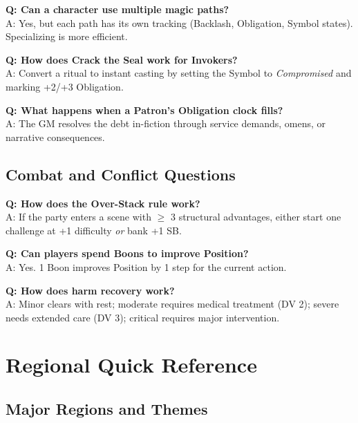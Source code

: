 \textbf{Q: Can a character use multiple magic paths?}\\
A: Yes, but each path has its own tracking (Backlash, Obligation, Symbol states). Specializing is more efficient.

\textbf{Q: How does Crack the Seal work for Invokers?}\\
A: Convert a ritual to instant casting by setting the Symbol to \emph{Compromised} and marking +2/+3 Obligation.

\textbf{Q: What happens when a Patron's Obligation clock fills?}\\
A: The GM resolves the debt in-fiction through service demands, omens, or narrative consequences.

\subsection{Combat and Conflict Questions}
\label{subsec:combat-questions}

\textbf{Q: How does the Over-Stack rule work?}\\
A: If the party enters a scene with $\geq$ 3 structural advantages, either start one challenge at +1 difficulty \emph{or} bank +1 SB.

\textbf{Q: Can players spend Boons to improve Position?}\\
A: Yes. 1 Boon improves Position by 1 step for the current action.

\textbf{Q: How does harm recovery work?}\\
A: Minor clears with rest; moderate requires medical treatment (DV 2); severe needs extended care (DV 3); critical requires major intervention.

\section{Regional Quick Reference}
\label{sec:regional-reference}

\subsection{Major Regions and Themes}
\label{subsec:regions-themes}

